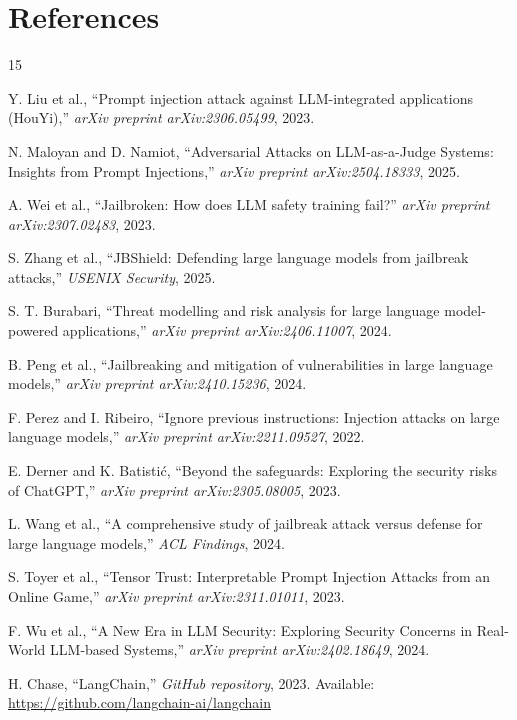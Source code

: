 \documentclass[conference]{IEEEtran}
\begin{document}
\section*{References}
\begin{thebibliography}{15}

Y. Liu et al., ``Prompt injection attack against LLM-integrated applications (HouYi),'' \textit{arXiv preprint arXiv:2306.05499}, 2023.

N. Maloyan and D. Namiot, ``Adversarial Attacks on LLM-as-a-Judge Systems: Insights from Prompt Injections,'' \textit{arXiv preprint arXiv:2504.18333}, 2025.

A. Wei et al., ``Jailbroken: How does LLM safety training fail?'' \textit{arXiv preprint arXiv:2307.02483}, 2023.

S. Zhang et al., ``JBShield: Defending large language models from jailbreak attacks,'' \textit{USENIX Security}, 2025.

S. T. Burabari, ``Threat modelling and risk analysis for large language model-powered applications,'' \textit{arXiv preprint arXiv:2406.11007}, 2024.

B. Peng et al., ``Jailbreaking and mitigation of vulnerabilities in large language models,'' \textit{arXiv preprint arXiv:2410.15236}, 2024.

F. Perez and I. Ribeiro, ``Ignore previous instructions: Injection attacks on large language models,'' \textit{arXiv preprint arXiv:2211.09527}, 2022.

E. Derner and K. Batistić, ``Beyond the safeguards: Exploring the security risks of ChatGPT,'' \textit{arXiv preprint arXiv:2305.08005}, 2023.

L. Wang et al., ``A comprehensive study of jailbreak attack versus defense for large language models,'' \textit{ACL Findings}, 2024.

S. Toyer et al., ``Tensor Trust: Interpretable Prompt Injection Attacks from an Online Game,'' \textit{arXiv preprint arXiv:2311.01011}, 2023.

F. Wu et al., ``A New Era in LLM Security: Exploring Security Concerns in Real-World LLM-based Systems,'' \textit{arXiv preprint arXiv:2402.18649}, 2024.

H. Chase, ``LangChain,'' \textit{GitHub repository}, 2023. Available: \url{https://github.com/langchain-ai/langchain}


\end{thebibliography}
\end{document}
